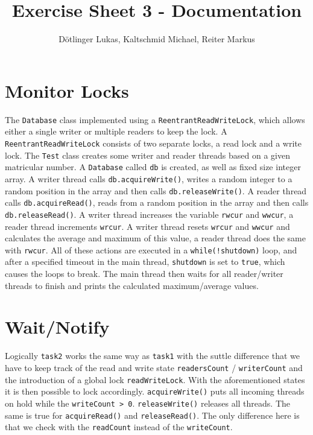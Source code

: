 \documentclass{article}
\begin{document}
	\title{Exercise Sheet 3 - Documentation}
	\date{}
	\author{Dötlinger Lukas, Kaltschmid Michael, Reiter Markus}

	\maketitle

  \section{Monitor Locks}

    The \texttt{Database} class implemented using a \texttt{ReentrantReadWriteLock}, which allows either a single writer or multiple readers to keep the lock. A \texttt{ReentrantReadWriteLock} consists of two separate locks, a read lock and a write lock.
    The \texttt{Test} class creates some writer and reader threads based on a given matricular number. A \texttt{Database} called \texttt{db} is created, as well as fixed size integer array.
    A writer thread calls \texttt{db.acquireWrite()}, writes a random integer to a random position in the array and then calls \texttt{db.releaseWrite()}.
    A reader thread calls \texttt{db.acquireRead()}, reads from a random position in the array and then calls \texttt{db.releaseRead()}.
    A writer thread increases the variable \texttt{rwcur} and \texttt{wwcur}, a reader thread increments \texttt{wrcur}.
    A writer thread resets \texttt{wrcur} and \texttt{wwcur} and calculates the average and maximum of this value, a reader thread does the same with \texttt{rwcur}.
    All of these actions are executed in a \texttt{while(!shutdown)} loop, and after a specified timeout in the main thread, \texttt{shutdown} is set to \texttt{true}, which causes the loops to break. The main thread then waits for all reader/writer threads to finish and prints the calculated maximum/average values.

  \section{Wait/Notify}
    Logically \texttt{task2} works the same way as \texttt{task1} with the suttle difference that we have to keep track of the read and write state \texttt{readersCount} / \texttt{writerCount} and the introduction of a global lock \texttt{readWriteLock}. With the aforementioned states it is then possible to lock accordingly. \texttt{acquireWrite()} puts all incoming threads on hold while the \texttt{writeCount > 0}. \texttt{releaseWrite()} releases all threads. The same is true for \texttt{acquireRead()} and \texttt{releaseRead()}. The only difference here is that we check with the \texttt{readCount} instead of the \texttt{writeCount}.
\end{document}
